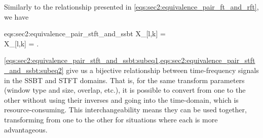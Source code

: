 Similarly to the relationship presented in \cref{eqs:sec2:equivalence_pair_ft_and_rft}, we have
%
\begin{subgather}{eqs:sec2:equivalence_pair_stft_and_ssbt}
	X_{\sS}[l,k] =   \label{eqs:sec2:equivalence_pair_stft_and_ssbt:subeq1}\\
	X_{\sF}[l,k] =   .\label{eqs:sec2:equivalence_pair_stft_and_ssbt:subeq2}
\end{subgather}
\cref{eqs:sec2:equivalence_pair_stft_and_ssbt:subeq1,eqs:sec2:equivalence_pair_stft_and_ssbt:subeq2} give us a bijective relationship between time-frequency signals in the SSBT and STFT domains. That is, for the same transform parameters (window type and size, overlap, etc.), it is possible to convert from one to the other without using their inverses and going into the time-domain, which is resource-consuming. This interchangeability means they can be used together, transforming from one to the other for situations where each is more advantageous.


